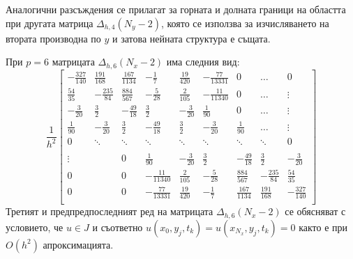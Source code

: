 \documentclass{article}
\begin{document}
Аналогични разсъждения се прилагат за горната и долната граници на областта при другата матрица $\Delta_{h,4}(N_y-2)$, която се използва за изчисляването на втората производна по $y$ и затова нейната структура е същата.

При $p=6$ матрицата $\Delta_{h,6}(N_x-2)$ има следния вид:
\[
\frac{1}{h^2}
\begin{bmatrix}
   -\frac{327}{140}	& \frac{191}{168}	&   \frac{167}{1134}	& -\frac{1}{7}    		 & \frac{19}{420}	& -\frac{77}{13331}   &    0      	   	&   \dots           & 0    \\
    \frac{54}{35}    	&-\frac{235}{84}   	&    \frac{884}{567}    &-\frac{5}{28}  	 	& \frac{2}{105}		&  -\frac{11}{11340}	 &   0      	   	&   \dots	       & \vdots  \\
    -\frac{3}{20}		& \frac{3}{2}         	& -\frac{49}{18} 	&  \frac{3}{2}		&  -\frac{3}{20}    	 &   \frac{1}{90}    	 &  0			&     \dots         &\vdots    \\
    \frac{1}{90}		& -\frac{3}{20}		& \frac{3}{2}         	& -\frac{49}{18} 	&  \frac{3}{2}		&  -\frac{3}{20}    	 &   \frac{1}{90} &     \dots         &\vdots    \\
        0           		& \ddots        		&         \ddots           	& \ddots        		&    \ddots   		&   \ddots      		 &     \ddots    	&  \ddots          &    0 \\	
\\
   \vdots      		&            		 	&    	0	      		& \frac{1}{90}		& -\frac{3}{20}		& \frac{3}{2}         	& -\frac{49}{18}	&  \frac{3}{2}  &  -\frac{3}{20} \\
    0      			&              	 	&    0      		&   -\frac{11}{11340}	 	&    \frac{2}{105} 	&  -\frac{5}{28} 	& \frac{884}{567} &-\frac{235}{84} &  \frac{54}{35}\\
    0              	& 	          		&    0              	&  -\frac{77}{13331}    		&  \frac{19}{420}&-\frac{1}{7}	 &  \frac{167}{1134} 	& \frac{191}{168}  &  -\frac{327}{140}\\
\end{bmatrix}
\]
Третият и предпредпоследният ред на матрицата $\Delta_{h,6}(N_x-2)$ се обясняват с условието, че $u \in J$ и съответно $u(x_0, y_j, t_k) = u(x_{N_x}, y_j, t_k) = 0$ както е при $O(h^2)$ апроксимацията. 
\end{document}
